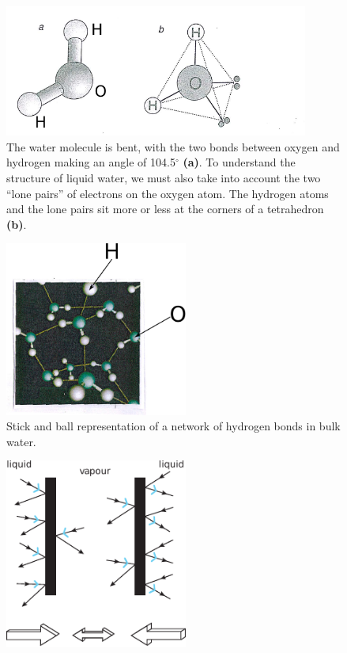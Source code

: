 \begin{subappendices}
\begin{figure}
\end{figure}
\begin{figure}
\centerline{\includegraphics[width=10cm]{C8/figsC8/fig6G6.pdf}}
\caption{The water molecule is bent, with the two bonds between oxygen and hydrogen making an angle of 104.5$^\circ$ \textbf{(a)}. To understand the structure of liquid water, we must also take into account the two ``lone pairs'' of electrons on the oxygen atom. The hydrogen atoms and the lone pairs sit more or less at the corners of a tetrahedron \textbf{(b)}.}\label{fig6G6}
\end{figure}
\begin{figure}
\centerline{\includegraphics[width=6cm]{C8/figsC8/fig6G7.pdf}}
\caption{Stick and ball representation  of a network of hydrogen bonds in bulk water. }\label{fig6G7}
\end{figure}
\begin{figure}
\centerline{\includegraphics[width=6cm]{C8/figsC8/fig6G8.pdf}}

\end{figure}
\end{subappendices}

